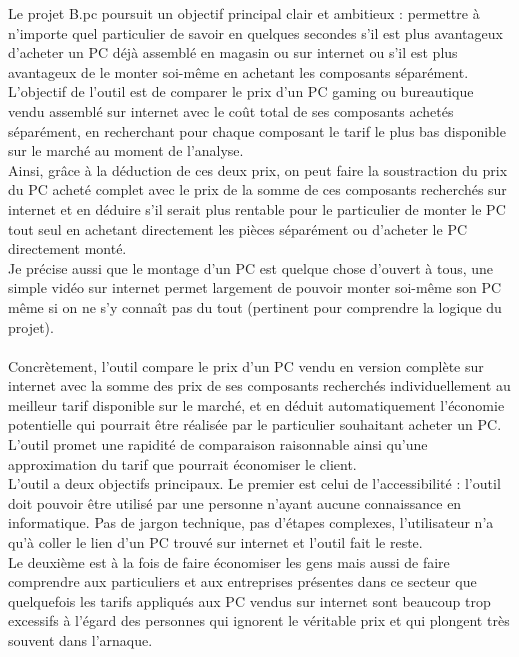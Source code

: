 \documentclass[a4paper, 12pt, twoside]{article}
\begin{document}
Le projet B.pc poursuit un objectif principal clair et ambitieux : permettre à n'importe quel particulier de savoir en quelques secondes s'il est plus avantageux d'acheter un PC déjà assemblé en magasin ou sur internet ou s'il est plus avantageux de le monter soi-même en achetant les composants séparément.\\
L'objectif de l'outil est de comparer le prix d'un PC gaming ou bureautique vendu assemblé sur internet avec le coût total de ses composants achetés séparément, en recherchant pour chaque composant le tarif le plus bas disponible sur le marché au moment de l'analyse.\\
Ainsi, grâce à la déduction de ces deux prix, on peut faire la soustraction du prix du PC acheté complet avec le prix de la somme de ces composants recherchés sur internet et en déduire s'il serait plus rentable pour le particulier de monter le PC tout seul en achetant directement les pièces séparément ou d’acheter le PC directement monté.\\
Je précise aussi que le montage d’un PC est quelque chose d'ouvert à tous, une simple vidéo sur internet permet largement de pouvoir monter soi-même son PC même si on ne s’y connaît pas du tout (pertinent pour comprendre la logique du projet).\\
\\
Concrètement, l'outil compare le prix d'un PC vendu en version complète sur internet avec la somme des prix de ses composants recherchés individuellement au meilleur tarif disponible sur le marché, et en déduit automatiquement l'économie potentielle qui pourrait être réalisée par le particulier souhaitant acheter un PC. L’outil promet une rapidité de comparaison raisonnable ainsi qu’une approximation du tarif que pourrait économiser le client.\\

L’outil a deux objectifs principaux. Le premier est celui de l'accessibilité : l'outil doit pouvoir être utilisé par une personne n'ayant aucune connaissance en informatique. Pas de jargon technique, pas d'étapes complexes, l'utilisateur n'a qu'à coller le lien d'un PC trouvé sur internet et l'outil fait le reste. \\
Le deuxième est à la fois de faire économiser les gens mais aussi de faire comprendre aux particuliers et aux entreprises présentes dans ce secteur que quelquefois les tarifs appliqués aux PC vendus sur internet sont beaucoup trop excessifs à l’égard des personnes qui ignorent le véritable prix et qui plongent très souvent dans l’arnaque.\\
\end{document}
